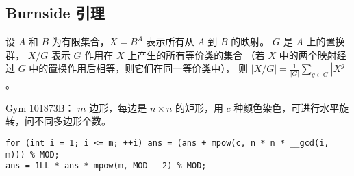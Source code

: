 \subsection{Burnside 引理}
设 $A$ 和 $B$ 为有限集合，$X=B^A$ 表示所有从 $A$ 到 $B$ 的映射。
$G$ 是 $A$ 上的置换群，
$X/G$ 表示 $G$ 作用在 $X$ 上产生的所有等价类的集合
（若 $X$ 中的两个映射经过 $G$ 中的置换作用后相等，则它们在同一等价类中），
则 $|X/G|=\frac{1}{|G|}\sum_{g\in G}|X^g|$。

Gym 101873B：
$m$ 边形，每边是 $n \times n$ 的矩形，用 $c$ 种颜色染色，可进行水平旋转，问不同多边形个数。
\begin{lstlisting}
for (int i = 1; i <= m; ++i) ans = (ans + mpow(c, n * n * __gcd(i, m))) % MOD;
ans = 1LL * ans * mpow(m, MOD - 2) % MOD;
\end{lstlisting}